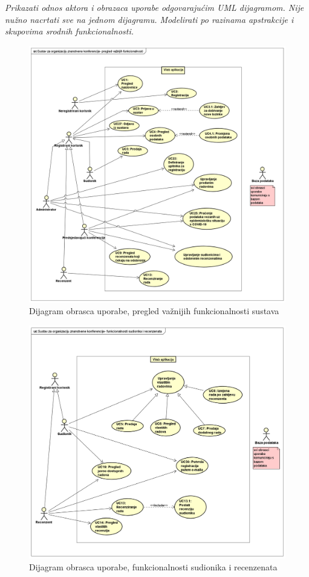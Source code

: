 					\textit{Prikazati odnos aktora i obrazaca uporabe odgovarajućim UML dijagramom. Nije nužno nacrtati sve na jednom dijagramu. Modelirati po razinama apstrakcije i skupovima srodnih funkcionalnosti.}
					\begin{figure}[H]
						\includegraphics[scale=0.35]{dijagrami/pregledvaznijihfunkcionalnosti.png} 
						\centering
						\caption{Dijagram obrasca uporabe, pregled važnijih funkcionalnosti sustava}
						\label{fig:dijagramobrascauporabe1}
					\end{figure}
					\begin{figure}[H]
						\includegraphics[scale=0.35]{dijagrami/funkcionalnosti-sudionici-recenzenti.png} 
						\centering
						\caption{Dijagram obrasca uporabe, funkcionalnosti sudionika i recenzenata}
						\label{fig:dijagramobrascauporabe2}
					\end{figure}
